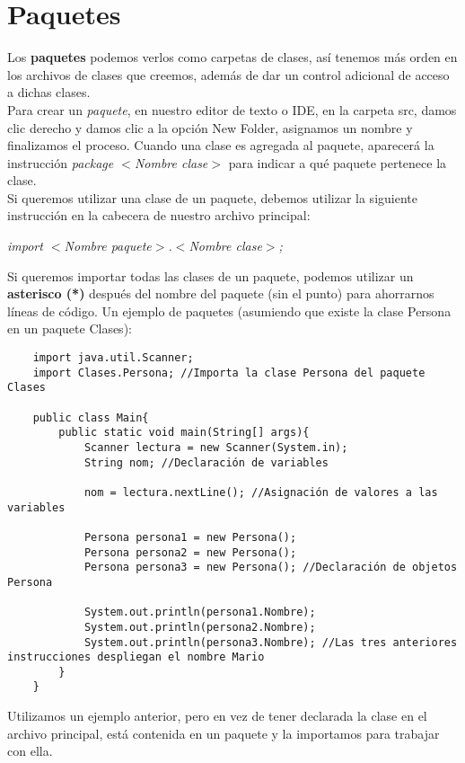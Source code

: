 \section{Paquetes}
Los \textbf{paquetes} podemos verlos como carpetas de clases, así tenemos más orden en los archivos de clases que creemos, además de dar un control adicional de acceso a dichas clases.\\
Para crear un \textit{paquete}, en nuestro editor de texto o IDE, en la carpeta src, damos clic derecho y damos clic a la opción New Folder, asignamos un nombre y finalizamos el proceso. Cuando una clase es agregada al paquete, aparecerá la instrucción \textit{package $<$Nombre clase$>$} para indicar a qué paquete pertenece la clase.\\
Si queremos utilizar una clase de un paquete, debemos utilizar la siguiente instrucción en la cabecera de nuestro archivo principal:\begin{center}\textit{import $<$Nombre paquete$>$.$<$Nombre clase$>$;}\end{center}
Si queremos importar todas las clases de un paquete, podemos utilizar un \textbf{asterisco (*)} después del nombre del paquete (sin el punto) para ahorrarnos líneas de código. Un ejemplo de paquetes (asumiendo que existe la clase Persona en un paquete Clases):
\begin{lstlisting}
    import java.util.Scanner;
    import Clases.Persona; //Importa la clase Persona del paquete Clases
    
    public class Main{
        public static void main(String[] args){
            Scanner lectura = new Scanner(System.in);
            String nom; //Declaración de variables
            
            nom = lectura.nextLine(); //Asignación de valores a las variables
            
            Persona persona1 = new Persona();
            Persona persona2 = new Persona();
            Persona persona3 = new Persona(); //Declaración de objetos Persona
            
            System.out.println(persona1.Nombre);
            System.out.println(persona2.Nombre);
            System.out.println(persona3.Nombre); //Las tres anteriores instrucciones despliegan el nombre Mario
        }
    }
\end{lstlisting}
Utilizamos un ejemplo anterior, pero en vez de tener declarada la clase en el archivo principal, está contenida en un paquete y la importamos para trabajar con ella.

